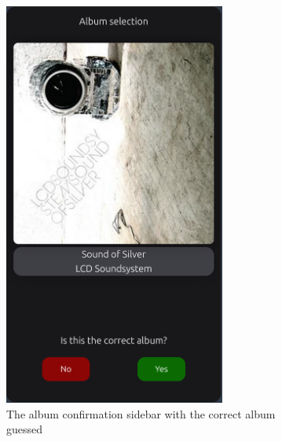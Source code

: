 \begin{figure}[H]
    \centering
    \begin{subfigure}[t]{0.3\textwidth}
        \centering
        \includegraphics[width=0.8\textwidth]{figures/corrent_album_confirm.png}
        \caption{The album confirmation sidebar with the correct album guessed}
        \label{fig:album_confirmation_sidebar}
    \end{subfigure}
    \begin{subfigure}[t]{0.3\textwidth}
        \centering

\end{subfigure}
\end{figure}
